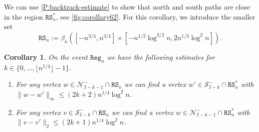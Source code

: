 \documentclass[11pt,twoside]{amsart}
\theoremstyle{plain}
\newtheorem{cor}[thm]{Corollary}
\numberwithin{quest}{section}
\theoremstyle{remark}
\numberwithin{rem}{section}
\theoremstyle{definition}
\newcommand{\cS}{\mathcal{S}}
\newcommand{\cN}{\mathcal{N}}
\renewcommand{\tt}[1]{{\mathtt{#1}}}
\begin{document}
	
We can use \cref{P:backtrack-estimate} to show that north and south paths are close in the region $\tt{RS}_n^*$, see \cref{fig:corollary62}. For this corollary, we introduce the smaller set 
$$
\tt{RS}_n := \beta_n([-n^{3/4}, n^{3/4}] \times [- n^{1/2} \log^{3/2} n, 2n^{1/3} \log^2 n]).
$$
\begin{cor}
	\label{C:close-ties}
	On the event $\tt{Reg}_n$ we have the following estimates for $k \in \{0, \dots, \lfloor n^{1/4} \rfloor - 1\}$.
	\begin{enumerate}[label=\arabic*.]
		\item For any vertex $w \in \cN_{I-k-1}^- \cap \tt{RS}_n$ we can find a vertex $w' \in \cS_{I-k}^- \cap \tt{RS}_n^*$ with $\|w - w'\|_\infty \le (2k + 2) n^{1/4} \log^{2} n$.
		\item For any vertex $v \in \cS_{I-k}^- \cap \tt{RS}_n$ we can find a vertex $w \in \cN_{I-k-1}^- \cap \tt{RS}_n^*$ with $\|v - v'\|_2 \le (2k + 1) n^{1/4} \log^{2} n$.		
	\end{enumerate}
\end{cor}
\end{document}
